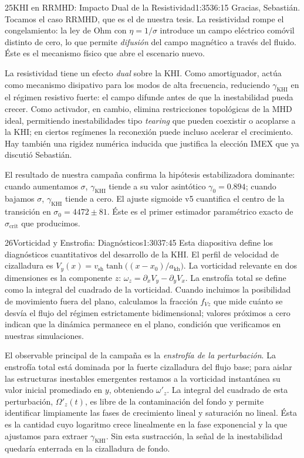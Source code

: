 \documentclass[11pt,a4paper]{article}
\begin{document}
\begin{bryorador}{25}{KHI en RRMHD: Impacto Dual de la Resistividad}{1:35}{36:15}
Gracias, Sebastián. Tocamos el caso RRMHD, que es el de nuestra tesis. La
resistividad rompe el congelamiento: la ley de Ohm con $\eta=1/\sigma$
introduce un campo eléctrico comóvil distinto de cero, lo que permite
\emph{difusión} del campo magnético a través del fluido. Éste es el mecanismo
físico que abre el escenario nuevo.

La resistividad tiene un efecto \emph{dual} sobre la KHI. Como amortiguador,
actúa como mecanismo disipativo para los modos de alta frecuencia, reduciendo
$\gamma_\text{KHI}$ en el régimen resistivo fuerte: el campo difunde antes de
que la inestabilidad pueda crecer. Como activador, en cambio, elimina
restricciones topológicas de la MHD ideal, permitiendo inestabilidades tipo
\emph{tearing} que pueden coexistir o acoplarse a la KHI; en ciertos
regímenes la reconexión puede incluso acelerar el crecimiento. Hay también
una rigidez numérica inducida que justifica la elección IMEX que ya discutió
Sebastián.

El resultado de nuestra campaña confirma la hipótesis estabilizadora
dominante: cuando aumentamos $\sigma$, $\gamma_\text{KHI}$ tiende a su valor
asintótico $\gamma_0=0.894$; cuando bajamos $\sigma$, $\gamma_\text{KHI}$
tiende a cero. El ajuste sigmoide v5 cuantifica el centro de la transición en
$\sigma_0=4472\pm 81$. Éste es el primer estimador paramétrico exacto de
$\sigma_\text{crit}$ que producimos.
\end{bryorador}

\begin{bryorador}{26}{Vorticidad y Enstrofia: Diagnósticos}{1:30}{37:45}
Esta diapositiva define los diagnósticos cuantitativos del desarrollo de la
KHI. El perfil de velocidad de cizalladura es
$V_y(x)=v_\text{sh}\tanh\bigl((x-x_0)/a_\text{kh}\bigr)$. La vorticidad
relevante en dos dimensiones es la componente $z$:
$\omega_z=\partial_x V_y-\partial_y V_x$. La enstrofía total se define como
la integral del cuadrado de la vorticidad. Cuando incluimos la posibilidad de
movimiento fuera del plano, calculamos la fracción $f_{Vz}$ que mide cuánto
se desvía el flujo del régimen estrictamente bidimensional; valores próximos
a cero indican que la dinámica permanece en el plano, condición que
verificamos en nuestras simulaciones.

El observable principal de la campaña es la \emph{enstrofía de la
perturbación}. La enstrofía total está dominada por la fuerte cizalladura del
flujo base; para aislar las estructuras inestables emergentes restamos a la
vorticidad instantánea su valor inicial promediado en $y$, obteniendo
$\omega'_z$. La integral del cuadrado de esta perturbación, $\Omega'_z(t)$,
es libre de la contaminación del fondo y permite identificar limpiamente las
fases de crecimiento lineal y saturación no lineal. Ésta es la cantidad cuyo
logaritmo crece linealmente en la fase exponencial y la que ajustamos para
extraer $\gamma_\text{KHI}$. Sin esta sustracción, la señal de la
inestabilidad quedaría enterrada en la cizalladura de fondo.
\end{bryorador}
\end{document}
